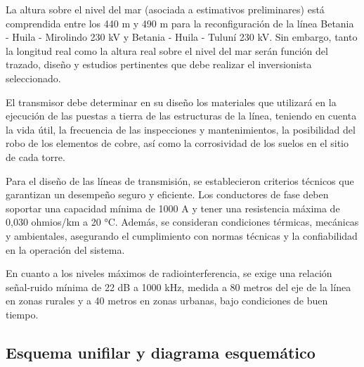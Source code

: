 La altura sobre el nivel del mar (asociada a estimativos preliminares) está comprendida entre los 440 m y 490 m para la reconfiguración de la línea Betania - Huila - Mirolindo 230 kV y Betania - Huila - Tuluní 230 kV. Sin embargo, tanto la longitud real como la altura real sobre el nivel del mar serán función del trazado, diseño y estudios pertinentes que debe realizar el inversionista seleccionado.

El transmisor debe determinar en su diseño los materiales que utilizará en la ejecución de las puestas a tierra de las estructuras de la línea, teniendo en cuenta la vida útil, la frecuencia de las inspecciones y mantenimientos, la posibilidad del robo de los elementos de cobre, así como la corrosividad de los suelos en el sitio de cada torre.

Para el diseño de las líneas de transmisión, se establecieron criterios técnicos que garantizan un desempeño seguro y eficiente. Los conductores de fase deben soportar una capacidad mínima de 1000 A y tener una resistencia máxima de 0,030 ohmios/km a 20 °C. Además, se consideran condiciones térmicas, mecánicas y ambientales, asegurando el cumplimiento con normas técnicas y la confiabilidad en la operación del sistema.

En cuanto a los niveles máximos de radiointerferencia, se exige una relación señal-ruido mínima de 22 dB a 1000 kHz, medida a 80 metros del eje de la línea en zonas rurales y a 40 metros en zonas urbanas, bajo condiciones de buen tiempo.


\subsection*{Esquema unifilar y diagrama esquemático}


